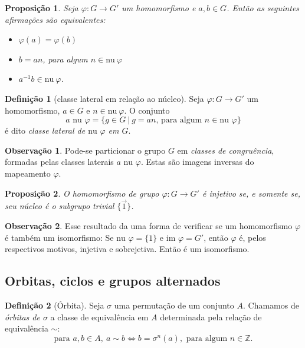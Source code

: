 \documentclass[a4paper,12pt]{report}
\theoremstyle{plain}
\newtheorem{proposicao}{Proposição}[section]
\theoremstyle{definition}
\newtheorem{definicao}{Definição}[section]
\newtheorem{observacao}{Observação}[section]
\begin{document}
\begin{proposicao}
	Seja \(\varphi: G\longrightarrow G'\) um
	homomorfismo e \(a,b \in G\). Então as seguintes afirmações são
	equivalentes:
	\begin{itemize}
		\item
		\(\varphi(a) = \varphi(b)\)
		\item
		\(b = an\), para algum \(n\in \text{nu} \ \varphi\)
		\item
		\(a^{-1}b \in \text{nu} \ \varphi\).
	\end{itemize}	
\end{proposicao}

\begin{definicao}[classe lateral em relação ao núcleo]
	Seja \(\varphi: G\longrightarrow G'\) um
	homomorfismo, \(a \in G\) e \(n\in\text{nu}\ \varphi\). O conjunto
	\[a\text{ nu }\varphi = \{g\in G \ | \ g = an \text{, para algum } n\in\text{nu }\varphi\}\] é dito \emph{classe lateral de \(\text{nu }\varphi\) em \(G\)}.	
\end{definicao}

\begin{observacao}
	Pode-se particionar o grupo \(G\) em \emph{classes de congruência},
	formadas pelas classes laterais \(a\text{ nu }\varphi\). Estas são imagens
	inversas do mapeamento \(\varphi\).
\end{observacao}

\begin{proposicao}
	O homomorfismo de grupo
	\(\varphi: G\longrightarrow G'\) é injetivo se, e somente se, seu núcleo
	é o subgrupo trivial \(\{\vec 1\}\).
\end{proposicao}

\begin{observacao}
	Esse resultado da uma forma de verificar se um homomorfismo \(\varphi\)
	é também um isomorfismo: Se \(\text{nu }\varphi = \{1\}\) e
	\(\text{im } \varphi = G'\), então \(\varphi\) é, pelos respectivos
	motivos, injetiva e sobrejetiva. Então é um isomorfismo.
\end{observacao}

\subsection{Orbitas, ciclos e grupos alternados}

\begin{definicao}[Órbita]\label{def:orbit}
	Seja $\sigma$ uma permutação de um conjunto $A$. Chamamos de \emph{órbitas de $\sigma$} a classe de equivalência em $A$ determinada pela relação de equivalência $\sim$:
	$$\text{para }a,b \in A,\ a\sim b \iff b=\sigma^n(a), \text{ para algum }n\in\mathbb{Z}.$$
\end{definicao}
\end{document}
